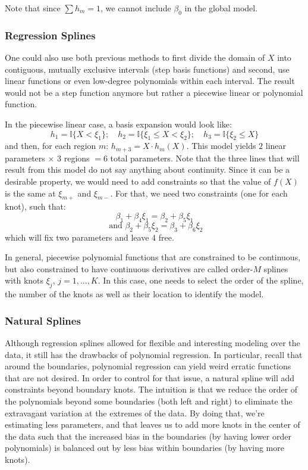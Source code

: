 \documentclass[12pt]{report}
\begin{document}

Note that since $\sum h_m = 1$, we cannot include $\beta_0$ in the global model.

\subsubsection{Regression Splines}

One could also use both previous methods to first divide the domain of $X$ into contiguous, mutually exclusive intervals (step basis functions) and second, use linear functions or even low-degree polynomials within each interval. The result would not be a step function anymore but rather a piecewise linear or polynomial function.

In the piecewise linear case, a basis expansion would look like: $$ h_1 = \mathbb{I}\{X < \xi_1\};  \quad h_2 = \mathbb{I}\{\xi_1 \leq X < \xi_2\};  \quad h_3 = \mathbb{I}\{\xi_2 \leq X\}$$ and then, for each region $m$: $h_{m+3} = X\cdot h_m(X)$. This model yields $2$ linear parameters $\times$  $3$ regions $= 6$ total parameters. Note that the three lines that will result from this model do not say anything about continuity. Since it can be a desirable property, we would need to add constraints so that the value of $f(X)$ is the same at $\xi_{m+}$ and $\xi_{m-}$. For that, we need two constraints (one for each knot), such that: $$ \beta_1 + \beta_4\xi_1 = \beta_2 + \beta_5\xi_1 $$ $$\text{ and } \beta_2 + \beta_5\xi_2 = \beta_3 + \beta_6\xi_2 $$ which will fix two parameters and leave 4 free.


In general, piecewise polynomial functions that are constrained to be continuous, but also constrained to have continuous derivatives are called order-$M$ splines with knots $\xi_j$, $j=1,..., K$. In this case, one needs to select the order of the spline, the number of the knots as well as their location to identify the model.

\subsubsection{Natural Splines}

Although regression splines allowed for flexible and interesting modeling over the data, it still has the drawbacks of polynomial regression. In particular, recall that around the boundaries, polynomial regression can yield weird erratic functions that are not desired. In order to control for that issue, a natural spline will add constraints beyond boundary knots. The intuition is that we reduce the order of the polynomials beyond some boundaries (both left and right) to eliminate the extravagant variation at the extremes of the data. By doing that, we're estimating less parameters, and that leaves us to add more knots in the center of the data such that the increased bias in the boundaries (by having lower order polynomials) is balanced out by less bias within boundaries (by having more knots).
\end{document}
